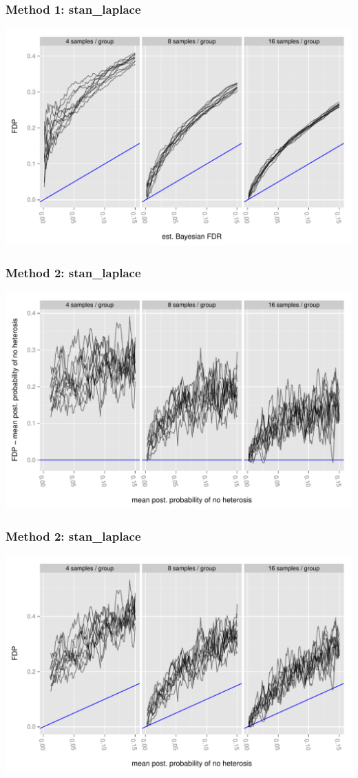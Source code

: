 \documentclass[handout]{beamer}
\numberwithin{equation}{section}
\begin{document}
\begin{frame}
\frametitle{Method 1: stan\_laplace}
\begin{center}
\includegraphics[scale=0.5]{../fig/fdr-indiv-dan-stan_laplace-leave-no}
\end{center}
\end{frame}

\begin{frame}
\frametitle{Method 2: stan\_laplace}
\begin{center}
\includegraphics[scale=0.5]{../fig/fdr-indiv-jarad-stan_laplace-subtract-no}
\end{center}
\end{frame}

\begin{frame}
\frametitle{Method 2: stan\_laplace}
\begin{center}
\includegraphics[scale=0.5]{../fig/fdr-indiv-jarad-stan_laplace-leave-no}
\end{center}
\end{frame}
\end{document}

